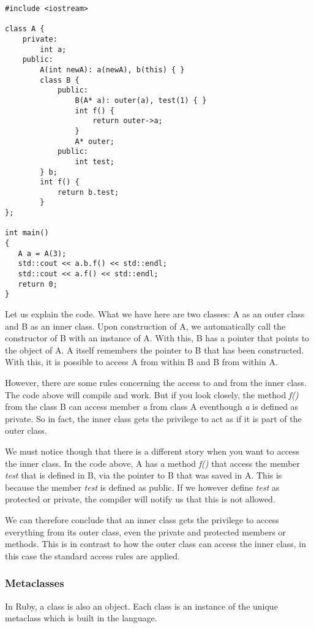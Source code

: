 \documentclass[10pt,a4paper,twocolumn]{article}
\begin{document}
\begin{lstlisting}
#include <iostream>

class A {
	private:
		int a;
	public:
		A(int newA): a(newA), b(this) { }
		class B {
			public:
				B(A* a): outer(a), test(1) { }
				int f() {
					return outer->a;
				}
				A* outer;
			public:
				int test;
		} b;
		int f() {
			return b.test;
		}
};
 
int main()
{
   A a = A(3);
   std::cout << a.b.f() << std::endl;
   std::cout << a.f() << std::endl;
   return 0;
}
\end{lstlisting}

Let us explain the code. What we have here are two classes: A as an outer class and B as an inner class. Upon construction of A, we automatically call the constructor of B with an instance of A. With this, B has a pointer that points to the object of A. A itself remembers the pointer to B that has been constructed. With this, it is possible to access A from within B and B from within A.

However, there are some rules concerning the access to and from the inner class. The code above will compile and work. But if you look closely, the method \textit{f()} from the class B can access member \textit{a} from class A eventhough \textit{a} is defined as private. So in fact, the inner class gets the privilege to act as if it is part of the outer class.

We must notice though that there is a different story when you want to access the inner class. In the code above, A has a method \textit{f()} that access the member \textit{test} that is defined in B, via the pointer to B that was saved in A. This is because the member \textit{test} is defined as public. If we however define \textit{test} as protected or private, the compiler will notify us that this is not allowed.

We can therefore conclude that an inner class gets the privilege to access everything from its outer class, even the private and protected members or methods. This is in contrast to how the outer class can access the inner class, in this case the standard access rules are applied.

\subsubsection{Metaclasses}
In Ruby, a class is also an object. Each class is an instance of the unique metaclass which is built in the language.
\end{document}
